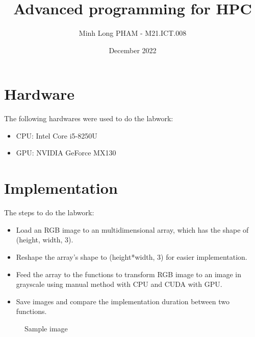 \documentclass{article}
\title{Advanced programming for HPC}
\author{Minh Long PHAM - M21.ICT.008}
\date{December 2022}
\begin{document}
\maketitle

\section{Hardware}
The following hardwares were used to do the labwork:
\begin{itemize}
    \item CPU: Intel Core i5-8250U 
    \item GPU: NVIDIA GeForce MX130
\end{itemize}

\section{Implementation}
The steps to do the labwork:
\begin{itemize}
    \item Load an RGB image to an multidimensional array, which has the shape of (height, width, 3).
    \item Reshape the array's shape to (height*width, 3) for easier implementation.
    \item Feed the array to the functions to transform RGB image to an image in grayscale using manual method with CPU and CUDA with GPU.
    \item Save images and compare the implementation duration between two functions.
\end{itemize}

\begin{figure}[H]
    \caption{Sample image}
\end{figure}
\end{document}
